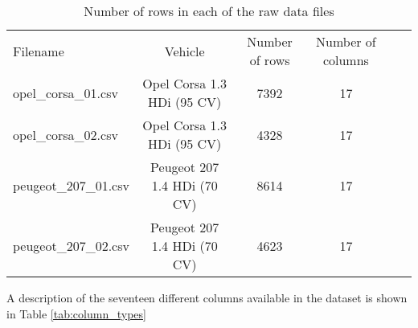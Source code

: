 \documentclass[a4paper,11pt]{article}
\begin{document}
\begin{table}[!ht]
	\caption{Number of rows in each of the raw data files}\label{tab:file_rows}
	\centering
	\begin{tabular}{lccccc}\toprule
		Filename & Vehicle & Number of rows & Number of columns \\ 
		opel\_corsa\_01.csv & Opel Corsa 1.3 HDi (95 CV) & 7392 & 17 \\ 
		opel\_corsa\_02.csv & Opel Corsa 1.3 HDi (95 CV) & 4328 & 17 \\ 
		peugeot\_207\_01.csv & Peugeot 207 1.4 HDi (70 CV) & 8614 & 17 \\ 
		peugeot\_207\_02.csv & Peugeot 207 1.4 HDi (70 CV) & 4623 & 17 \\ \bottomrule
	\end{tabular}
\end{table}

A description of the seventeen different columns available in the dataset is shown in Table \ref{tab:column_types}
\end{document}
